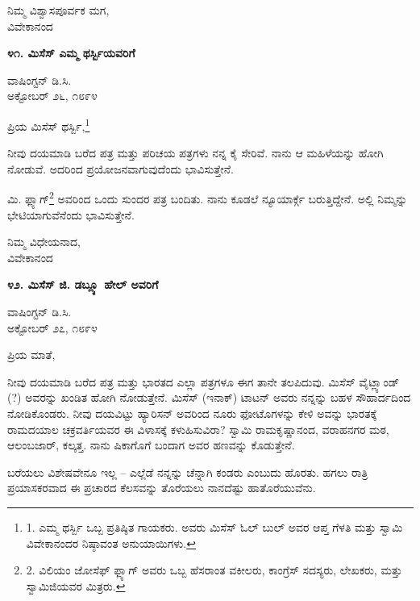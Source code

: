 \begin{flushright}
ನಿಮ್ಮ ವಿಶ್ವಾಸಪೂರ್ವಕ ಮಗ,\\ವಿವೇಕಾನಂದ
\end{flushright}

\begin{center}
\textbf{೪೧. ಮಿಸೆಸ್ ಎಮ್ಮ ಥರ್ಸ್ಬಿಯವರಿಗೆ}
\end{center}

\begin{flushright}
ವಾಷಿಂಗ್ಟನ್ ಡಿ.ಸಿ.\\ಅಕ್ಟೋಬರ್ ೨೬, ೧೮೯೪
\end{flushright}

ಪ್ರಿಯ ಮಿಸೆಸ್ ಥರ್ಸ್ಬಿ,\footnote{1. ಎಮ್ಮ ಥರ್ಸ್ಬಿ ಒಬ್ಬ ಪ್ರತಿಷ್ಠಿತ ಗಾಯಕರು. ಅವರು ಮಿಸೆಸ್ ಓಲ್ ಬುಲ್ ಅವರ ಆಪ್ತ ಗೆಳತಿ ಮತ್ತು ಸ್ವಾಮಿ ವಿವೇಕಾನಂದರ ನಿಷ್ಠಾವಂತ ಅನುಯಾಯಿಗಳು.}

ನೀವು ದಯಮಾಡಿ ಬರೆದ ಪತ್ರ ಮತ್ತು ಪರಿಚಯ ಪತ್ರಗಳು ನನ್ನ ಕೈ ಸೇರಿವೆ. ನಾನು ಆ ಮಹಿಳೆಯನ್ನು ಹೋಗಿ ನೋಡುವೆ. ಅದರಿಂದ ಪ್ರಯೋಜನವಾಗುವುದೆಂದು ಭಾವಿಸುತ್ತೇನೆ.

ಮಿ. ಫ್ಲ್ಯಾಗ್\footnote{2. ವಿಲಿಯಂ ಜೋಸೆಫ್ ಫ್ಲ್ಯಾಗ್ ಅವರು ಒಬ್ಬ ಹೆಸರಾಂತ ವಕೀಲರು, ಕಾಂಗ್ರೆಸ್ ಸದಸ್ಯರು, ಲೇಖಕರು, ಮತ್ತು ಸ್ವಾಮಿಜಿಯವರ ಮಿತ್ರರು.} ಅವರಿಂದ ಒಂದು ಸುಂದರ ಪತ್ರ ಬಂದಿತು. ನಾನು ಕೂಡಲೆ ನ್ಯೂಯಾರ್ಕ್ಗೆ ಬರುತ್ತಿದ್ದೇನೆ. ಅಲ್ಲಿ ನಿಮ್ಮನ್ನು ಭೇಟಿಯಾಗುವೆನೆಂದು ಭಾವಿಸುತ್ತೇನೆ.

\begin{flushright}
ನಿಮ್ಮ ವಿಧೇಯನಾದ,\\ವಿವೇಕಾನಂದ
\end{flushright}

\begin{center}
\textbf{೪೨. ಮಿಸೆಸ್ ಜಿ. ಡಬ್ಲ್ಯೂ ಹೇಲ್ ಅವರಿಗೆ}
\end{center}

\begin{flushright}
ವಾಷಿಂಗ್ಟನ್ ಡಿ.ಸಿ.\\ಅಕ್ಟೋಬರ್ ೨೭, ೧೮೯೪
\end{flushright}

ಪ್ರಿಯ ಮಾತೆ,

ನೀವು ದಯಮಾಡಿ ಬರೆದ ಪತ್ರ ಮತ್ತು ಭಾರತದ ಎಲ್ಲಾ ಪತ್ರಗಳೂ ಈಗ ತಾನೇ ತಲಪಿದುವು. ಮಿಸೆಸ್ ವೈಟ್ಲ್ಯಾಂಡ್ (?) ಅವರನ್ನು ಖಂಡಿತ ಹೋಗಿ ನೋಡುತ್ತೇನೆ. ಮಿಸೆಸ್ (ಇನಾಕ್) ಟಾಟನ್ ಅವರು ನನ್ನನ್ನು ಬಹಳ ಸೌಹಾರ್ದದಿಂದ ನೋಡಿಕೊಂಡರು. ನೀವು ದಯವಿಟ್ಟು ಹ್ಯಾರಿಸನ್ ಅವರಿಂದ ನೂರು ಫೋಟೊಗಳನ್ನು ಕೇಳಿ ಅವನ್ನು ಭಾರತಕ್ಕೆ ರಾಮದಯಾಲ ಚಕ್ರವರ್ತಿಯವರ ಈ ವಿಳಾಸಕ್ಕೆ ಕಳುಹಿಸುವಿರಾ?  ಸ್ವಾಮಿ ರಾಮಕೃಷ್ಣಾನಂದ, ವರಾಹನಗರ ಮಠ, ಆಲಂಬಜಾರ್, ಕಲ್ಕತ್ತ. ನಾನು ಷಿಕಾಗೊಗೆ ಬಂದಾಗ ಅವರ ಹಣವನ್ನು ಕೊಡುತ್ತೇನೆ.

ಬರೆಯಲು ವಿಶೇಷವೇನೂ ಇಲ್ಲ – ಎಲ್ಲೆಡೆ ನನ್ನನ್ನು ಚೆನ್ನಾಗಿ ಕಂಡರು ಎಂಬುದು ಹೊರತು. ಹಗಲು ರಾತ್ರಿ ಪ್ರಯಾಸಕರವಾದ ಈ ಪ್ರಚಾರದ ಕೆಲಸವನ್ನು ತೊರೆಯಲು ನಾನದೆಷ್ಟು ಹಾತೊರೆಯುವೆನು.

